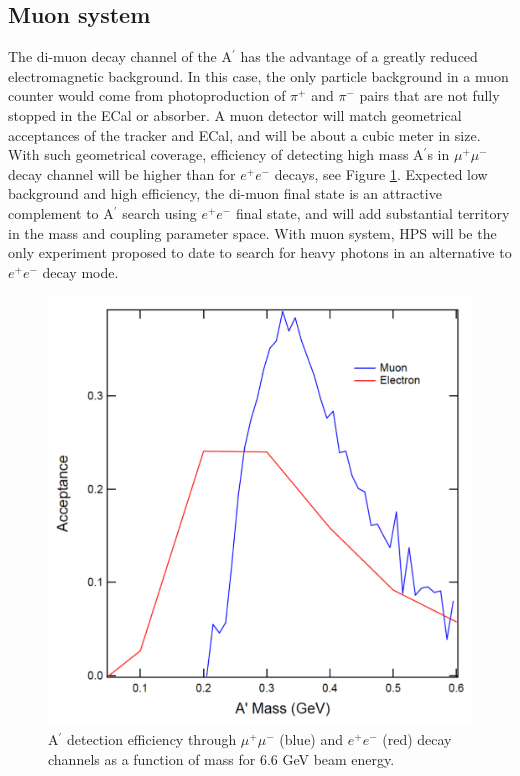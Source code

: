 \subsection{Muon system}

\label{sec:muon}


The di-muon decay channel of the A$^\prime$ has the advantage of a greatly reduced electromagnetic background.  In this case, the only particle background in a muon counter would come from photoproduction of $\pi^+$ and $\pi^-$ pairs that are not fully stopped in the ECal or absorber.  A muon detector will match geometrical acceptances of the tracker and ECal, and will be about a cubic meter in size. With such geometrical coverage, efficiency of detecting high mass A$^\prime$s in $\mu^+\mu^-$ decay channel will be higher than for $e^+e^-$ decays, see Figure \ref{fig:muacc}. Expected low background and high efficiency, the di-muon final state is an attractive complement to A$^\prime$ search using $e^+e^-$ final state, and will add substantial territory in the mass and coupling parameter space. With muon system, HPS will be the only experiment proposed to date to search for heavy photons in an alternative to $e^+e^-$ decay mode.

\begin{figure}[!ht]
\includegraphics[scale=0.4]{muon/acc.pdf}
\caption{\small{A$^\prime$ detection efficiency through $\mu^+\mu^-$ (blue) and $e^+e^-$ (red) decay channels as a function of mass for 6.6 GeV beam energy.}}\label{fig:muacc}
\end{figure}

